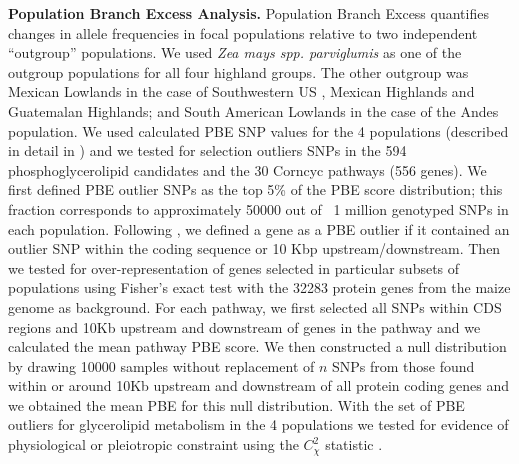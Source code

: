 \documentclass[9pt,twocolumn,twoside,lineno]{BioRxiv}
\begin{document}
\textbf{Population Branch Excess Analysis.}
Population Branch Excess quantifies changes in allele frequencies in focal populations relative to two independent “outgroup” populations.
We used \textit{Zea mays spp. parviglumis} as one of the outgroup populations for all four highland groups.  
The other outgroup was  Mexican Lowlands  in the case of Southwestern US , Mexican Highlands and Guatemalan Highlands; and South American Lowlands in the case of the Andes population. 
We used calculated PBE SNP values for the 4 populations (described in detail in \cite{Wang2020-mp}) and we tested for selection outliers SNPs in the 594 phosphoglycerolipid candidates and the 30 Corncyc pathways (556 genes).
We first defined PBE outlier SNPs as the top 5\% of the PBE score distribution; this fraction corresponds to approximately 50000 out of ~1 million genotyped SNPs in each population. 
Following \cite{Wang2020-mp}, we defined a gene as a PBE outlier if it contained an outlier SNP within the coding sequence or 10 Kbp upstream/downstream. 
Then we tested for over-representation of genes selected in particular subsets of populations using Fisher's exact test with the 32283 protein genes from the maize genome as background. 
For each pathway, we first selected all SNPs within CDS regions and 10Kb upstream and downstream of genes in the pathway and we calculated the mean pathway PBE score. 
We then constructed a null distribution by drawing 10000 samples without replacement of $n$ SNPs from those found within or around 10Kb upstream and downstream of all protein coding genes and we obtained the mean PBE for this null distribution. 
With the set of PBE outliers for glycerolipid metabolism in the 4 populations we tested for evidence of physiological or pleiotropic constraint using the $C_\chi^2$ statistic \cite{yeaman2018}. 
\end{document}
